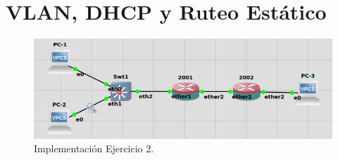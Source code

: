 \documentclass[letterpaper,12pt]{article}
\begin{document}
\section{VLAN, DHCP y Ruteo Estático}
\begin{figure}[ht] 
        
        \centering \includegraphics[width=0.8\columnwidth]{lab12topo.PNG}
        \caption{
                \label{fig:samplesetup} %
                Implementación Ejercicio 2.
        }
\end{figure}
\end{document}
